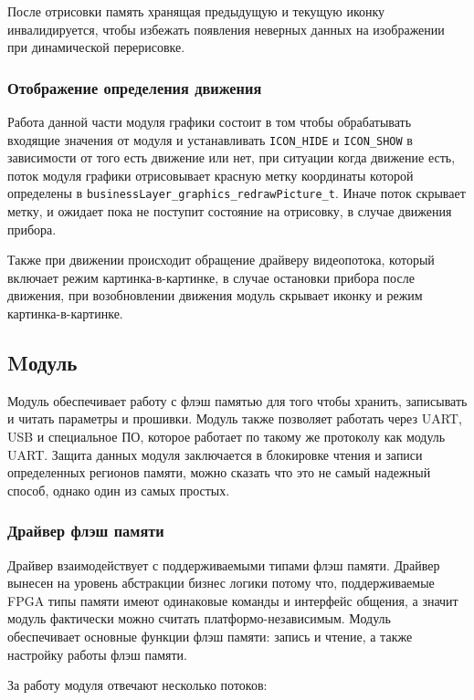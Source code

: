 После отрисовки память хранящая предыдущую и текущую иконку инвалидируется, чтобы избежать появления неверных данных на изображении при динамической перерисовке. 

\subsubsection{Отображение определения движения}

Работа данной части модуля графики состоит в том чтобы обрабатывать входящие значения от модуля \moduleMoveDetect и устанавливать \lstinline{ICON_HIDE} и \lstinline{ICON_SHOW}
в зависимости от того есть движение или нет, при ситуации когда движение есть, поток модуля графики отрисовывает красную метку координаты которой определены в \lstinline{businessLayer_graphics_redrawPicture_t}.
Иначе поток скрывает метку, и ожидает пока не поступит состояние на отрисовку, в случае движения прибора. 

Также при движении происходит обращение драйверу видеопотока,
который включает режим картинка-в-картинке, в случае остановки прибора после движения, при возобновлении движения модуль скрывает иконку и режим картинка-в-картинке.

\subsection{Mодуль \moduleFlashMemory}

Модуль обеспечивает работу с флэш памятью для того чтобы хранить, записывать и читать параметры и прошивки. Модуль также позволяет работать через UART, USB и специальное 
ПО, которое работает по такому же протоколу как модуль UART. Защита данных модуля заключается в блокировке чтения и записи определенных регионов памяти, можно сказать что это
не самый надежный способ, однако один из самых простых. 

\subsubsection{Драйвер флэш памяти}

Драйвер взаимодействует с поддерживаемыми типами флэш памяти. Драйвер вынесен на уровень абстракции бизнес логики потому что, поддерживаемые FPGA типы памяти имеют
одинаковые команды и интерфейс общения, а значит модуль фактически можно считать платформо-независимым. Модуль обеспечивает основные функции флэш памяти: запись и чтение,
а также настройку работы флэш памяти. 

За работу модуля отвечают несколько потоков:

